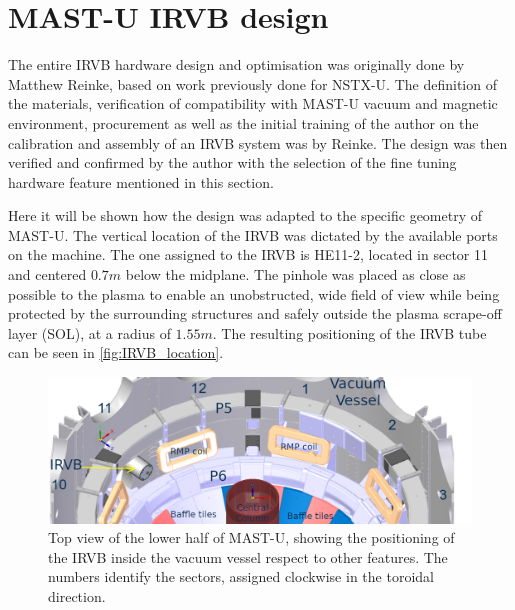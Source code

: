 \section{MAST-U IRVB design}\label{MAST-U IRVB design}
The entire IRVB hardware design and optimisation was originally done by Matthew Reinke, based on work previously done for NSTX-U.\cite{VanEden2016} The definition of the materials, verification of compatibility with MAST-U vacuum and magnetic environment, procurement as well as the initial training of the author on the calibration and assembly of an IRVB system was by Reinke. The design was then verified and confirmed by the author with the selection of the fine tuning hardware feature mentioned in this section.

Here it will be shown how the design was adapted to the specific geometry of MAST-U.
The vertical location of the IRVB was dictated by the available ports on the machine. The one assigned to the IRVB is HE11-2, located in sector 11 and centered $0.7m$ below the midplane. The pinhole was placed as close as possible to the plasma to enable an unobstructed, wide field of view while being protected by the surrounding structures and safely outside the plasma scrape-off layer (SOL), at a radius of $1.55m$. The resulting positioning of the IRVB tube can be seen in \autoref{fig:IRVB_location}. 

\begin{figure}[!ht]
	\centering
	\includegraphics[trim={7 0 60 0},clip,width=0.8\linewidth]{Chapters/chapter2/figs/where_irvb2.png}
	\caption{Top view of the lower half of MAST-U, showing the positioning of the IRVB inside the vacuum vessel respect to other features. The numbers identify the sectors, assigned clockwise in the toroidal direction.}
	\label{fig:IRVB_location}
\end{figure}

